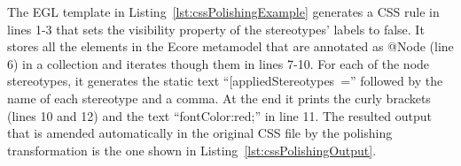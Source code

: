 
The EGL template in Listing~\ref{lst:cssPolishingExample} generates a CSS rule in lines 1-3 that sets the visibility property of the stereotypes' labels to false. 
It stores all the elements in the Ecore metamodel that are annotated as @Node (line 6) in a collection and iterates though them in lines 7-10. 
For each of the node stereotypes, it generates the static text ``[appliedStereotypes~='' followed by the name of each stereotype and a comma. 
At the end it prints the curly brackets (lines 10 and 12) and the text ``fontColor:red;'' in line 11. 
The resulted output that is amended automatically in the original CSS file by the polishing transformation is the one shown in Listing~\ref{lst:cssPolishingOutput}.

\begin{figure}[ht!]
	\vspace*{-5mm}
	
\end{figure}


